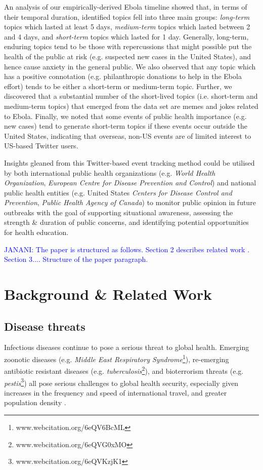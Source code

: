 \documentclass[letterpaper]{article}
\begin{document}
An analysis of our empirically-derived Ebola timeline showed that, in terms of
their temporal duration,  identified topics fell into three main groups:  \emph{long-term} topics which
lasted at least 5 days,  \emph{medium-term} topics which lasted between
2 and 4 days, and \emph{short-term} topics which lasted for 1 day.
Generally,  long-term, enduring topics tend to be those with repercussions
that might possible put the health of the public at risk
(e.g. suspected new cases in the United States), and hence cause
anxiety in the general public.   We also observed
that any topic which has a positive connotation (e.g. philanthropic
donations to help in the Ebola effort) tends to be either a
short-term or medium-term topic.   Further, we discovered that a
substantial number of the  short-lived topics (i.e. short-term and
medium-term topics) that emerged from the data set are
memes and jokes related to Ebola.   Finally, we noted that some events
of public health importance (e.g. new cases) tend to generate
short-term topics if these events occur outside the United States,
indicating that overseas, non-US events are of limited interest to US-based
Twitter users.


 Insights gleaned from this 
Twitter-based event tracking method could be utilised by
both international public health organizations (e.g. \emph{World Health
Organization}, \emph{European Centre for Disease Prevention and Control}) and national
public health entities (e.g. United States \emph{Centers for Disease
  Control and Prevention}, \emph{Public Health Agency of Canada})  to
monitor public opinion in future outbreaks with the goal of  supporting situational 
awareness, assessing the strength \& duration of public concerns, 
and identifying potential opportunities for health education.

\textcolor{blue}{JANANI: The paper is structured as follows.  Section 2 describes related work
.  Section 3....  Structure of the paper paragraph.}

 
\section{Background \& Related Work}
\subsection{Disease threats}
Infectious diseases continue to pose a serious threat to global
health.  Emerging zoonotic diseases (e.g. \emph{Middle East Respiratory
Syndrome}\footnote{www.webcitation.org/6eQV6BcML}), re-emerging
antibiotic resistant diseases
(e.g. \emph{tuberculosis}\footnote{www.webcitation.org/6eQVG0xMO}), and
bioterrorism threats
(e.g. \emph{pestis}\footnote{www.webcitation.org/6eQVKzjK1}) all pose serious
challenges to global health security, especially given increases in
the frequency and speed of international travel, and greater population
density \cite{Hartley:2010aa}. %
\end{document}
